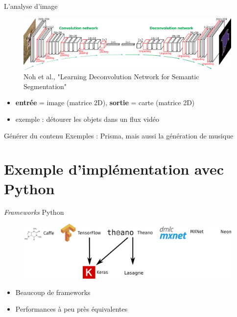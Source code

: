 \documentclass{beamer}
\begin{document}
\begin{frame}{L'analyse d'image}
\begin{figure}
	\includegraphics[width=\textwidth]{deconvnet}\\
    \tiny{Noh et al., "Learning Deconvolution Network for Semantic Segmentation"}
\end{figure}
\begin{itemize}
	\item \textbf{entrée} = image (matrice 2D), \textbf{sortie} = carte (matrice 2D)
    \item exemple : détourer les objets dans un flux vidéo
 \end{itemize}
\end{frame}

\begin{frame}{Générer du contenu}  
Exemples : Prisma, mais aussi la génération de musique
\end{frame}

\section{Exemple d'implémentation avec Python}

\begin{frame}{\textit{Frameworks} Python}
\begin{figure}
	\includegraphics[width=\textwidth]{dl_frameworks_python}
\end{figure}
\begin{itemize}
	\item Beaucoup de frameworks
    \item Performances à peu près équivalentes
\end{itemize}
\end{frame}
\end{document}
